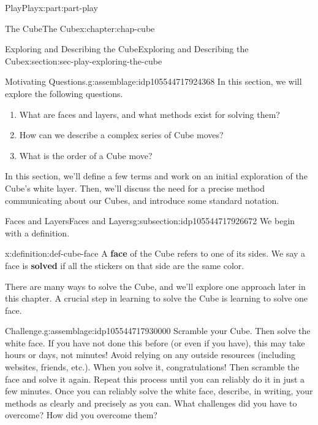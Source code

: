 \documentclass[oneside,10pt,]{book}
\newcommand{\terminology}[1]{\textbf{#1}}
\numberwithin{equation}{section}
\begin{document}
\begin{partptx}{Play}{}{Play}{}{}{x:part:part-play}
\begin{chapterptx}{The Cube}{}{The Cube}{}{}{x:chapter:chap-cube}
\typeout{************************************************}
%
\begin{sectionptx}{Exploring and Describing the Cube}{}{Exploring and Describing the Cube}{}{}{x:section:sec-play-exploring-the-cube}
\begin{assemblage}{Motivating Questions.}{g:assemblage:idp105544717924368}%
In this section, we will explore the following questions. %
\begin{enumerate}
\item{}What are faces and layers, and what methods exist for solving them?%
\item{}How can we describe a complex series of Cube moves?%
\item{}What is the order of a Cube move?%
\end{enumerate}
%
\end{assemblage}
\begin{introduction}{}%
In this section, we'll define a few terms and work on an initial exploration of the Cube's white layer. Then, we'll discuss the need for a precise method communicating about our Cubes, and introduce some standard notation.%
\end{introduction}%
%
%
\typeout{************************************************}
\typeout{************************************************}
%
\begin{subsectionptx}{Faces and Layers}{}{Faces and Layers}{}{}{g:subsection:idp105544717926672}
We begin with a definition.%
\begin{definition}{}{x:definition:def-cube-face}%
%
A \terminology{face} of the Cube refers to one of its sides. We say a face is \terminology{solved} if all the stickers on that side are the same color.%
\end{definition}
There are many ways to solve the Cube, and we'll explore one approach later in this chapter. A crucial step in learning to solve the Cube is learning to solve one face.%
\begin{assemblage}{Challenge.}{g:assemblage:idp105544717930000}%
Scramble your Cube. Then solve the white face. If you have not done this before (or even if you have), this may take hours or days, not minutes! Avoid relying on any outside resources (including websites, friends, etc.). When you solve it, congratulations! Then scramble the face and solve it again. Repeat this process until you can reliably do it in just a few minutes. Once you can reliably solve the white face, describe, in writing, your methods as clearly and precisely as you can. What challenges did you have to overcome? How did you overcome them?%

\end{assemblage}
\end{subsectionptx}
\end{sectionptx}
\end{chapterptx}
\end{partptx}
\end{document}
